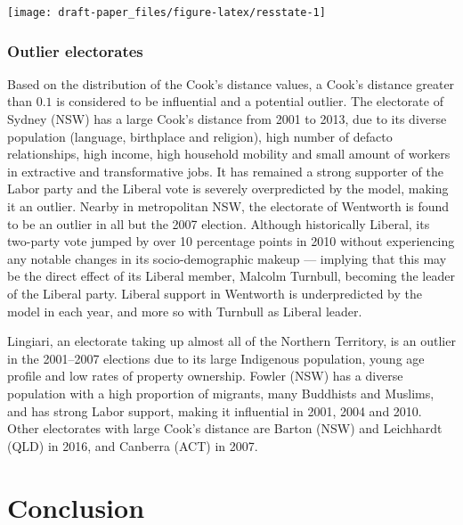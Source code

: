 \documentclass[11pt,a4paper,]{article}
\let\origfigure\figure
\let\endorigfigure\endfigure
\renewenvironment{figure}[1][2] {
    \expandafter\origfigure\expandafter[htbp]
} {
    \endorigfigure
}
\begin{document}
\begin{figure}[h]

{\centering \texttt{[image: draft-paper\_files/figure-latex/resstate-1]} 

}

\caption{Boxplot of residuals by state with jittered points. States ordered by median residual. A state-specific bias not captured by the model is evident.}\label{fig:resstate}
\end{figure}

\subsubsection{Outlier electorates}\label{outlier-electorates}

Based on the distribution of the Cook's distance values, a Cook's
distance greater than \(0.1\) is considered to be influential and a
potential outlier. The electorate of Sydney (NSW) has a large Cook's
distance from 2001 to 2013, due to its diverse population (language,
birthplace and religion), high number of defacto relationships, high
income, high household mobility and small amount of workers in
extractive and transformative jobs. It has remained a strong supporter
of the Labor party and the Liberal vote is severely overpredicted by the
model, making it an outlier. Nearby in metropolitan NSW, the electorate
of Wentworth is found to be an outlier in all but the 2007 election.
Although historically Liberal, its two-party vote jumped by over 10
percentage points in 2010 without experiencing any notable changes in
its socio-demographic makeup --- implying that this may be the direct
effect of its Liberal member, Malcolm Turnbull, becoming the leader of
the Liberal party. Liberal support in Wentworth is underpredicted by the
model in each year, and more so with Turnbull as Liberal leader.

Lingiari, an electorate taking up almost all of the Northern Territory,
is an outlier in the 2001--2007 elections due to its large Indigenous
population, young age profile and low rates of property ownership.
Fowler (NSW) has a diverse population with a high proportion of
migrants, many Buddhists and Muslims, and has strong Labor support,
making it influential in 2001, 2004 and 2010. Other electorates with
large Cook's distance are Barton (NSW) and Leichhardt (QLD) in 2016, and
Canberra (ACT) in 2007.

\section{Conclusion}\label{conclusion}
\end{document}
